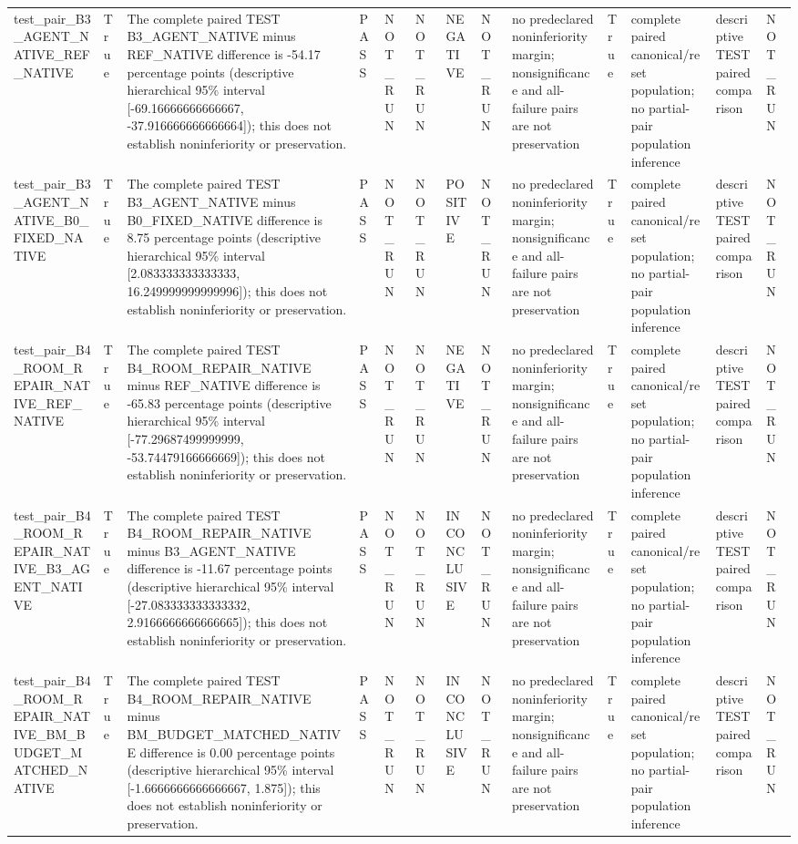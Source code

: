 \begin{tabular}{lllllllllllll}
test\_pair\_B3\_AGENT\_NATIVE\_REF\_NATIVE & True & The complete paired TEST B3\_AGENT\_NATIVE minus REF\_NATIVE difference is -54.17 percentage points (descriptive hierarchical 95\% interval [-69.16666666666667, -37.916666666666664]); this does not establish noninferiority or preservation. & PASS & NOT\_RUN & NOT\_RUN & NEGATIVE & NOT\_RUN & no predeclared noninferiority margin; nonsignificance and all-failure pairs are not preservation & True & complete paired canonical/reset population; no partial-pair population inference & descriptive TEST paired comparison & NOT\_RUN \\
test\_pair\_B3\_AGENT\_NATIVE\_B0\_FIXED\_NATIVE & True & The complete paired TEST B3\_AGENT\_NATIVE minus B0\_FIXED\_NATIVE difference is 8.75 percentage points (descriptive hierarchical 95\% interval [2.083333333333333, 16.249999999999996]); this does not establish noninferiority or preservation. & PASS & NOT\_RUN & NOT\_RUN & POSITIVE & NOT\_RUN & no predeclared noninferiority margin; nonsignificance and all-failure pairs are not preservation & True & complete paired canonical/reset population; no partial-pair population inference & descriptive TEST paired comparison & NOT\_RUN \\
test\_pair\_B4\_ROOM\_REPAIR\_NATIVE\_REF\_NATIVE & True & The complete paired TEST B4\_ROOM\_REPAIR\_NATIVE minus REF\_NATIVE difference is -65.83 percentage points (descriptive hierarchical 95\% interval [-77.29687499999999, -53.74479166666669]); this does not establish noninferiority or preservation. & PASS & NOT\_RUN & NOT\_RUN & NEGATIVE & NOT\_RUN & no predeclared noninferiority margin; nonsignificance and all-failure pairs are not preservation & True & complete paired canonical/reset population; no partial-pair population inference & descriptive TEST paired comparison & NOT\_RUN \\
test\_pair\_B4\_ROOM\_REPAIR\_NATIVE\_B3\_AGENT\_NATIVE & True & The complete paired TEST B4\_ROOM\_REPAIR\_NATIVE minus B3\_AGENT\_NATIVE difference is -11.67 percentage points (descriptive hierarchical 95\% interval [-27.083333333333332, 2.9166666666666665]); this does not establish noninferiority or preservation. & PASS & NOT\_RUN & NOT\_RUN & INCONCLUSIVE & NOT\_RUN & no predeclared noninferiority margin; nonsignificance and all-failure pairs are not preservation & True & complete paired canonical/reset population; no partial-pair population inference & descriptive TEST paired comparison & NOT\_RUN \\
test\_pair\_B4\_ROOM\_REPAIR\_NATIVE\_BM\_BUDGET\_MATCHED\_NATIVE & True & The complete paired TEST B4\_ROOM\_REPAIR\_NATIVE minus BM\_BUDGET\_MATCHED\_NATIVE difference is 0.00 percentage points (descriptive hierarchical 95\% interval [-1.6666666666666667, 1.875]); this does not establish noninferiority or preservation. & PASS & NOT\_RUN & NOT\_RUN & INCONCLUSIVE & NOT\_RUN & no predeclared noninferiority margin; nonsignificance and all-failure pairs are not preservation & True & complete paired canonical/reset population; no partial-pair population inference & descriptive TEST paired comparison & NOT\_RUN \\

\end{tabular}
